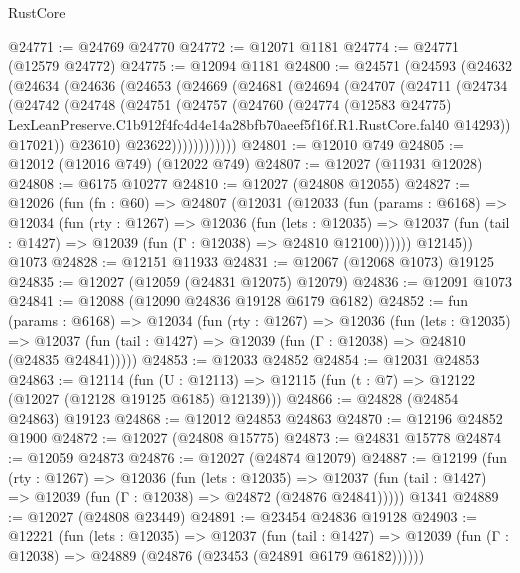 \begin{lexlean}{RustCore}
\begin{coremodule}
@24771 := @24769 @24770
@24772 := @12071 @1181
@24774 := @24771 (@12579 @24772)
@24775 := @12094 @1181
@24800 := @24571
    (@24593
      (@24632
        (@24634
          (@24636
            (@24653
              (@24669
                (@24681
                  (@24694
                    (@24707
                      (@24711
                        (@24734
                          (@24742
                            (@24748
                              (@24751
                                (@24757
                                  (@24760
                                    (@24774
                                      (@12583 @24775)
                                      LexLeanPreserve.C1b912f4fc4d4e14a28bfb70aeef5f16f.R1.RustCore.fal40
                                      @14293))
                                  @17021))
                              @23610)
                            @23622))))))))))))
@24801 := @12010 @749
@24805 := @12012 (@12016 @749) (@12022 @749)
@24807 := @12027 (@11931 @12028)
@24808 := @6175 @10277
@24810 := @12027 (@24808 @12055)
@24827 := @12026
    (fun (fn : @60) =>
    @24807
      (@12031
        (@12033
          (fun (params : @6168) =>
          @12034
            (fun (rty : @1267) =>
            @12036
              (fun (lets : @12035) =>
              @12037 (fun (tail : @1427) => @12039 (fun (Γ : @12038) => @24810 @12100))))))
        @12145))
    @1073
@24828 := @12151 @11933
@24831 := @12067 (@12068 @1073) @19125
@24835 := @12027 (@12059 (@24831 @12075) @12079)
@24836 := @12091 @1073
@24841 := @12088 (@12090 @24836 @19128 @6179 @6182)
@24852 := fun (params : @6168) =>
  @12034
    (fun (rty : @1267) =>
    @12036
      (fun (lets : @12035) =>
      @12037 (fun (tail : @1427) => @12039 (fun (Γ : @12038) => @24810 (@24835 @24841)))))
@24853 := @12033 @24852
@24854 := @12031 @24853
@24863 := @12114
    (fun (U : @12113) => @12115 (fun (t : @7) => @12122 (@12027 (@12128 @19125 @6185) @12139)))
@24866 := @24828 (@24854 @24863) @19123
@24868 := @12012 @24853 @24863
@24870 := @12196 @24852 @1900
@24872 := @12027 (@24808 @15775)
@24873 := @24831 @15778
@24874 := @12059 @24873
@24876 := @12027 (@24874 @12079)
@24887 := @12199
    (fun (rty : @1267) =>
    @12036
      (fun (lets : @12035) =>
      @12037 (fun (tail : @1427) => @12039 (fun (Γ : @12038) => @24872 (@24876 @24841)))))
    @1341
@24889 := @12027 (@24808 @23449)
@24891 := @23454 @24836 @19128
@24903 := @12221
    (fun (lets : @12035) =>
    @12037
      (fun (tail : @1427) =>
      @12039 (fun (Γ : @12038) => @24889 (@24876 (@23453 (@24891 @6179 @6182))))))

\end{coremodule}
\end{lexlean}
